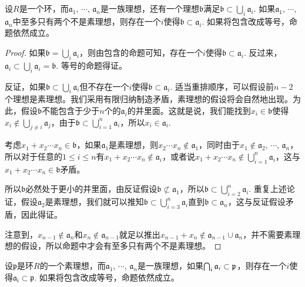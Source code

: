\begin{pro} \label{primeav}设$R$是一个环，而$\mathfrak{a}_1$, $\cdots$, $\mathfrak{a}_n$是一族理想，还有一个理想$\mathfrak{b}$满足$\mathfrak{b}\subset \bigcup_i \mathfrak{a}_i$. 如果$\mathfrak{a}_1$, $\cdots$, $\mathfrak{a}_n$中至多只有两个不是素理想，则存在一个$i$使得$\mathfrak{b}\subset \mathfrak{a}_i$. 如果将包含改成等号，命题依然成立。
\end{pro}

\begin{proof}
	如果$\mathfrak{b}=\bigcup_i \mathfrak{a}_i$，则由包含的命题可知，存在一个$i$使得$\mathfrak{b}\subset \mathfrak{a}_i$. 反过来，$\mathfrak{a}_i\subset \bigcup_i \mathfrak{a}_i=\mathfrak{b}$. 等号的命题得证。

	反证，如果$\mathfrak{b}\subset \bigcup_i \mathfrak{a}_i$但不存在一个$i$使得$\mathfrak{b}\subset \mathfrak{a}_i$. 适当重排顺序，可以假设前$n-2$个理想是素理想。我们采用有限归纳制造矛盾，素理想的假设将会自然地出现。为此，假设$\mathfrak{b}$不能包含于少于$n$个的$\mathfrak{a}_i$的并里面。这就是说，我们能找到$x_i\in \mathfrak{b}$使得$x_i\not\in \bigcup_{j\neq i}\mathfrak{a}_j$，由于$\mathfrak{b}\subset \bigcup_{i=1}^n \mathfrak{a}_i$，所以$x_i\in \mathfrak{a}_i$.

	考虑$x_1+x_2\cdots x_n\in \mathfrak{b}$，如果$\mathfrak{a}_1$是素理想，则$x_2\cdots x_n\not\in \mathfrak{a}_1$，同时由于$x_1\not\in \mathfrak{a}_2$, $\cdots$, $\mathfrak{a}_n$，所以对于任意的$1\leq i \leq n$有$x_1+x_2\cdots x_n\not\in \mathfrak{a}_i$，或者说$x_1+x_2\cdots x_n\not\in \bigcup_{i=1}^n \mathfrak{a}_i$，这与$x_1+x_2\cdots x_n\in \mathfrak{b}$矛盾。

	所以$\mathfrak{b}$必然处于更小的并里面，由反证假设$\mathfrak{b}\not\subset \mathfrak{a}_1$，所以$\mathfrak{b}\subset \bigcup_{i=2}^n \mathfrak{a}_i$. 重复上述论证，假设$\mathfrak{a}_2$是素理想，我们就可以推知$\mathfrak{b}\subset \bigcup_{i=3}^n \mathfrak{a}_i$直到$\mathfrak{b}\subset \mathfrak{a}_n$，这与反证假设矛盾，因此得证。 

	注意到，$x_{n-1}\not\in \mathfrak{a}_n$和$x_{n}\not\in \mathfrak{a}_{n-1}$就足以推出$x_{n-1}+x_{n}\not\in \mathfrak{a}_{n-1}\cup \mathfrak{a}_n$，并不需要素理想的假设，所以命题中才会有至多只有两个不是素理想。
\end{proof}

\begin{pro} \label{primeau}设$\mathfrak{p}$是环$R$的一个素理想，而$\mathfrak{a}_1$, $\cdots$, $\mathfrak{a}_n$是一族理想，如果$\bigcap_i \mathfrak{a}_i\subset \mathfrak{p}$，则存在一个$i$使得$\mathfrak{a_i}\subset \mathfrak{p}$. 如果将包含改成等号，命题依然成立。
\end{pro}

